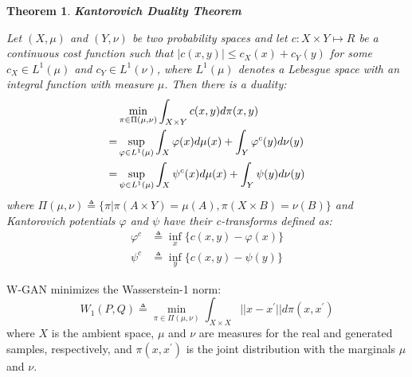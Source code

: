 \documentclass[12pt]{amsart}
\theoremstyle{plain}
\newtheorem{thm}{Theorem}[section]
\theoremstyle{definition}
\theoremstyle{remark}
\numberwithin{equation}{section}
\numberwithin{thm}{section}
\begin{document}
\begin{thm}
\textbf{Kantorovich Duality Theorem}

Let $(X,\mu)$ and $(Y,\nu)$ be two probability spaces and let $c: X \times Y \longmapsto R$ be a continuous cost function such that $| c(x,y) | \leq c_{X}(x) + c_{Y}(y) $ for some $c_X \in L^{1}(\mu)$ and $c_Y \in L^{1}(\nu)$, where $L^{1}(\mu)$ denotes a Lebesgue space with an integral function with measure $\mu$. Then there is a duality:
\begin{align}
& \min_{\pi \in \Pi(\mu,\nu)}\int_{X \times Y} c(x,y)d\pi(x,y) \notag \\
= & \sup_{\varphi \in L^{1}(\mu)}{\int_{X}\varphi(x)d\mu(x) + \int_{Y}\varphi^{c}(y)d\nu(y)} \\
= & \sup_{\psi \in L^{1}(\mu)}{\int_{X}\psi^{c}(x)d\mu(x) + \int_{Y}\psi(y)d\nu(y)} 
\end{align}    
where $\Pi(\mu,\nu) \triangleq \{\pi | \pi(A \times Y) = \mu(A), \pi(X \times B) = \nu(B)\}$ and Kantorovich potentials $\varphi$ and $\psi$ have their c-transforms defined as: \\
\begin{equation}   
\begin{aligned}
 \varphi^{c} & \triangleq \inf_{x}\{c(x,y) - \varphi(x)\} \\
 \psi^{c} & \triangleq \inf_{y}\{c(x,y)-\psi(y)\} 
\end{aligned}    
\end{equation}
\end{thm}
W-GAN minimizes the Wasserstein-1 norm:
\begin{equation}
    W_{1}(P,Q) \triangleq \min_{\pi \in \Pi(\mu,\nu)} \int_{X \times X} || x -x^{'} || d\pi(x,x^{'})
\end{equation}
where $X$ is the ambient space, $\mu$ and $\nu$ are measures for the real and generated samples, respectively, and $\pi(x,x^{'})$ is the joint distribution with the marginals $\mu$ and $\nu$.
\end{document}

